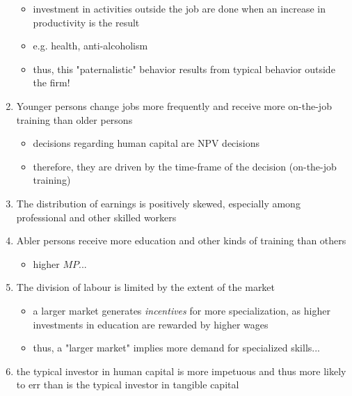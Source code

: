 \documentclass[12pt,a4paper]{article}
\begin{document}
\begin{enumerate}
      \begin{itemize}
        \item investment in activities outside the job are done when an
          increase in productivity is the result
        \item e.g. health, anti-alcoholism
        \item thus, this "paternalistic" behavior results from typical
          behavior outside the firm!
      \end{itemize}
    \item Younger persons change jobs more frequently and receive more
      on-the-job training than older persons
      \begin{itemize}
        \item decisions regarding human capital are NPV decisions
        \item therefore, they are driven by the time-frame of the
          decision (on-the-job training)
      \end{itemize}
    \item The distribution of earnings is positively skewed, especially
      among professional and other skilled workers
    \item Abler persons receive more education and other kinds of
      training than others
      \begin{itemize}
        \item higher $MP$...
      \end{itemize}
    \item The division of labour is limited by the extent of the
      market
      \begin{itemize}
        \item a larger market generates \emph{incentives} for more
          specialization, as higher investments in education are
          rewarded by higher wages
        \item thus, a "larger market" implies more demand for
          specialized skills...
      \end{itemize}
    \item the typical investor in human capital is more impetuous and thus
      more likely to err than is the typical investor in tangible capital
  \end{enumerate}
\end{document}

